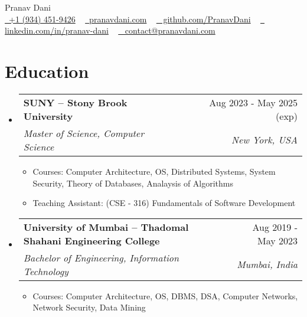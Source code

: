 \documentclass[letterpaper,11pt]{article}
\makeatletter
\newcommand{\resumeItem}[1]{
  \item\small{
    {#1 \vspace{-2pt}}
  }
}
\newcommand{\resumeSubheading}[4]{
  \vspace{-2pt}\item
    \begin{tabular*}{1.0\textwidth}[t]{l@{\extracolsep{\fill}}r}
      \vspace{-2pt}\textbf{#1} & \small #2 \\
      \textit{\small#3} & \textit{\small #4} \\
    \end{tabular*}\vspace{-7pt}
}
\newcommand{\resumeSubHeadingListStart}{\begin{itemize}[leftmargin=0.0in, label={}]}
\newcommand{\resumeSubHeadingListEnd}{\end{itemize}}
\newcommand{\resumeItemListStart}{\begin{itemize}}
\newcommand{\resumeItemListEnd}{\end{itemize}\vspace{-5pt}}
\makeatother
\begin{document}

\begin{center}
  {\huge Pranav Dani} \\ \vspace{4pt}
  \small
  \faMobile
  \href{tel:+19344529426}{\raisebox{-0.2\height}\ \color{black}+1 (934) 451-9426} ~
  \faGlobe \href{https://pranavdani.com}{\raisebox{-0.1\height}\ \color{black}pranavdani.com} ~
  \faGithub \href{https://github.com/PranavDani}{\raisebox{-0.2\height}\ \color{black} github.com/PranavDani} ~
  \faLinkedin \href{https://linkedin.com/in/pranav-dani}{\raisebox{-0.2\height}\ \color{black} linkedin.com/in/pranav-dani} ~
  \faEnvelope \href{mailto:contact@pranavdani.com}{\raisebox{-0.2\height}\   \color{black} contact@pranavdani.com}
  \vspace{-10pt}
\end{center}


\section{Education}
\resumeSubHeadingListStart
\resumeSubheading
{SUNY -- Stony Brook University}{Aug 2023 - May 2025 (exp)}
{Master of Science, Computer Science }{New York, USA}
\resumeItemListStart
\resumeItem{Courses: Computer Architecture, OS, Distributed Systems, System Security, Theory of Databases, Analaysis of Algorithms}
\vspace{-2pt}
\resumeItem{Teaching Assistant: (CSE - 316) Fundamentals of Software Development}
\resumeItemListEnd
\vspace{-5pt}

\resumeSubheading
{University of Mumbai -- Thadomal Shahani Engineering College}{Aug 2019 - May 2023}
{Bachelor of Engineering, Information Technology}{Mumbai, India}
\resumeItemListStart
\resumeItem{Courses: Computer Architecture, OS, DBMS, DSA, Computer Networks, Network Security, Data Mining}
\resumeItemListEnd
\resumeSubHeadingListEnd
\vspace{-20pt}
\end{document}
